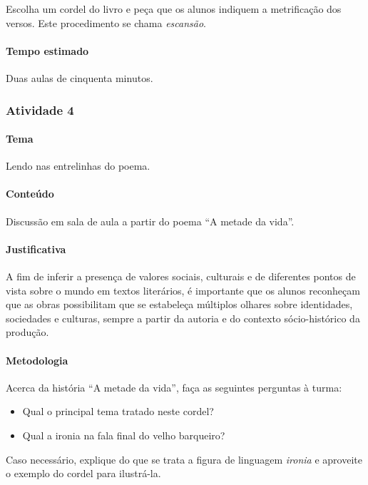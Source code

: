 \documentclass[11pt]{extarticle}
\begin{document}
Escolha um cordel do livro e peça que os alunos indiquem a metrificação dos versos. 
Este procedimento se chama \textit{escansão}.

\paragraph{Tempo estimado} Duas aulas de cinquenta minutos.


\subsubsection{Atividade 4}


\paragraph{Tema} Lendo nas entrelinhas do poema.

\paragraph{Conteúdo} Discussão em sala de aula a partir do poema ``A metade da vida''.

\paragraph{Justificativa} A fim de inferir a presença de valores sociais, 
culturais e de diferentes pontos de vista sobre o mundo em textos literários,
é importante que os alunos reconheçam que as obras possibilitam 
que se estabeleça múltiplos olhares sobre identidades, sociedades e culturas, 
sempre a partir da autoria e do contexto sócio-histórico da produção.

\paragraph{Metodologia} Acerca da história ``A metade da vida'', faça as seguintes perguntas
à turma:

\begin{itemize}
\item Qual o principal tema tratado neste cordel? 
\item Qual a ironia na fala final do velho barqueiro?
\end{itemize}

Caso necessário, explique do que se trata a figura de linguagem \textit{ironia} e 
aproveite o exemplo do cordel para ilustrá-la.
\end{document}
